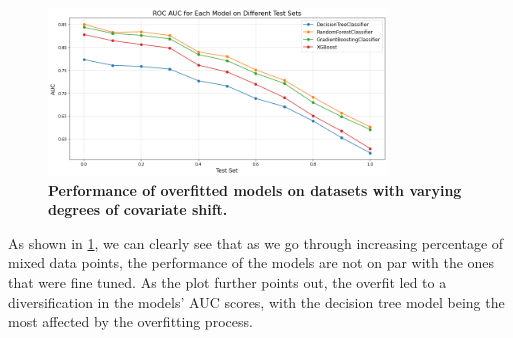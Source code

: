 \begin{figure}[H]
    \centering
    \includegraphics[width=0.8\textwidth]{assets/overfit_no_gam.png} 
    \caption{\textbf{Performance of overfitted models on datasets with varying degrees of covariate shift.}}
    \label{fig:overfitted-models-perf}
\end{figure}


As shown in \cref{fig:overfitted-models-perf}, we can clearly see that as we go through increasing percentage of mixed data points, the performance of the models are not on par with the ones that were fine tuned. As the plot further points out, the overfit led to a diversification in the models' AUC scores, with the decision tree model being the most affected by the overfitting process. 